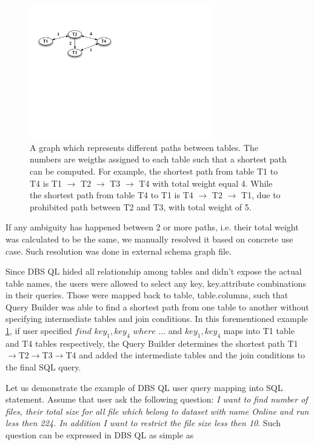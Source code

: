 \documentclass[a4paper]{jpconf}
\begin{document}
\begin{figure}[htb]
\centering
\includegraphics[width=80mm]{DBSSql_shortestpath.pdf}
\caption{A graph which represents different paths between tables. The
numbers are weigths assigned to each table such that a shortest path
can be computed. For example, the shortest path from table T1 to T4 is 
T1 $\rightarrow$ T2 $\rightarrow$ T3 $\rightarrow$ T4 with total weight 
equal 4. While the shortest path from table T4 to T1 is 
T4 $\rightarrow$ T2 $\rightarrow$ T1, due to prohibited path
between T2 and T3, with total weight of 5. 
}
\label{ShortestPath}
\end{figure}
If any ambiguity has happened between 2 or more paths, i.e.
their total weight was calculated to be the same, we manually 
resolved it based on concrete use case. 
Such resolution was done in external schema graph file.

Since DBS QL hided all relationship among tables and didn't
expose the actual table names, the users were allowed to
select any key, key.attribute combinations in their queries.
Those were mapped back to table, table.columns, such that
Query Builder was able to find a shortest path
from one table to another without specifying intermediate
tables and join conditions.
In this forementioned example \ref{ShortestPath},
if user specified
$
find\,\, key_1, key_4\,\, where\,\, ...
$
and $key_1, key_4$ maps into T1 table and T4 tables respectively,
the Query Builder determines
the shortest path 
T1$\rightarrow$T2$\rightarrow$T3$\rightarrow$T4 
and added the intermediate tables 
and the join conditions to the final SQL query. 

Let us demonstrate the example of DBS QL user query mapping
into SQL statement. Assume that user ask the following
question: {\it I want to find number of files, their total
size for all file which belong to dataset with name Online
and run less then 224. In addition I want to restrict
the file size less then 10}. Such question can be
expressed in DBS QL as simple as
\end{document}

